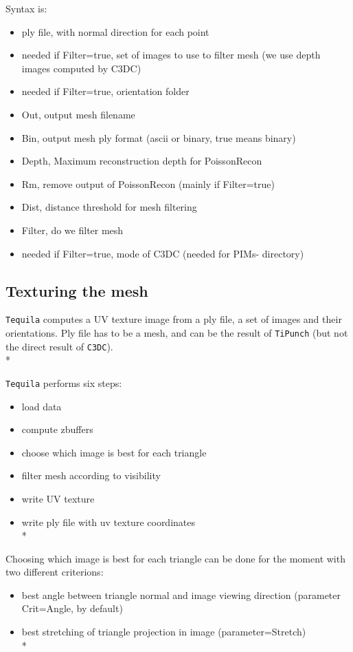 Syntax is:

\begin{itemize}
  \item ply file, with normal direction for each point
  \item needed if Filter=true, set of images to use to filter mesh (we use depth images computed by C3DC)
  \item needed if Filter=true, orientation folder
  \item Out, output mesh filename
  \item Bin, output mesh ply format (ascii or binary, true means binary)
  \item Depth, Maximum reconstruction depth for PoissonRecon
  \item Rm, remove output of PoissonRecon (mainly if Filter=true)
  \item Dist, distance threshold for mesh filtering
  \item Filter, do we filter mesh
  \item needed if Filter=true, mode of C3DC (needed for PIMs- directory)
\end{itemize}

\subsection{Texturing the mesh}

{\tt Tequila} computes a UV texture image from a ply file, a set of images and their orientations. Ply file has to be a mesh, and can be the result of {\tt TiPunch} (but not the direct result of {\tt C3DC}).\\*

{\tt Tequila} performs six steps:

\begin{itemize}
    \item load data
    \item compute zbuffers
    \item choose which image is best for each triangle
    \item filter mesh according to visibility
    \item write UV texture
    \item write ply file with uv texture coordinates\\*
\end{itemize}

Choosing which image is best for each triangle can be done for the moment with two different criterions:
\begin{itemize}
\item   best angle between triangle normal and image viewing direction (parameter Crit=Angle, by default)
\item   best stretching of triangle projection in image (parameter=Stretch)\\*
\end{itemize}

